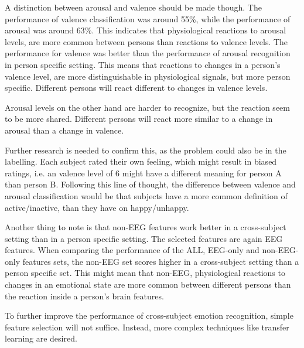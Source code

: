 \npar 

A distinction between arousal and valence should be made though. The performance of valence classification was around 55\%, while the performance of arousal was around 63\%. This indicates that physiological reactions to arousal levels, are more common between persons than reactions to valence levels. The performance for valence was better than the performance of arousal recognition in person specific setting. This means that reactions to changes in a person's valence level, are more distinguishable in physiological signals, but more person specific. Different persons will react different to changes in valence levels.

\npar

Arousal levels on the other hand are harder to recognize, but the reaction seem to be more shared. Different persons will react more similar to a change in arousal than a change in valence.

\npar

Further research is needed to confirm this, as the problem could also be in the labelling. Each subject rated their own feeling, which might result in biased ratings, i.e. an valence level of 6 might have a different meaning for person A than person B. Following this line of thought, the difference between valence and arousal classification would be that subjects have a more common definition of active/inactive, than they have on happy/unhappy.

\npar

Another thing to note is that non-EEG features work better in a cross-subject setting than in a person specific setting. The selected features are again EEG features. When comparing the performance of the ALL, EEG-only and non-EEG-only features sets, the non-EEG set scores higher in a cross-subject setting than a person specific set. This might mean that non-EEG, physiological reactions to changes in an emotional state are more common between different persons than the reaction inside a person's brain features.

\npar

To further improve the performance of cross-subject emotion recognition, simple feature selection will not suffice. Instead, more complex techniques like transfer learning are desired. 
